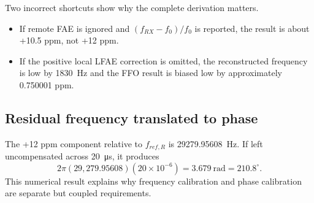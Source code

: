 \documentclass[10pt,a4paper]{article}
\begin{document}
Two incorrect shortcuts show why the complete derivation matters.
\begin{itemize}
\item If remote FAE is ignored and $(f_{RX}-f_0)/f_0$ is reported, the result is about +10.5 ppm, not +12 ppm.
\item If the positive local LFAE correction is omitted, the reconstructed frequency is low by \SI{1830}{\hertz} and the FFO result is biased low by approximately 0.750001 ppm.
\end{itemize}

\subsection{Residual frequency translated to phase}
The +12 ppm component relative to $f_{ref,R}$ is \SI{29279.95608}{\hertz}. If left uncompensated across \SI{20}{\micro\second}, it produces
\begin{equation}
2\pi(29,279.95608)(20\times10^{-6})=3.679\ \text{rad}=210.8^\circ.
\end{equation}
This numerical result explains why frequency calibration and phase calibration are separate but coupled requirements.

\clearpage
\end{document}

